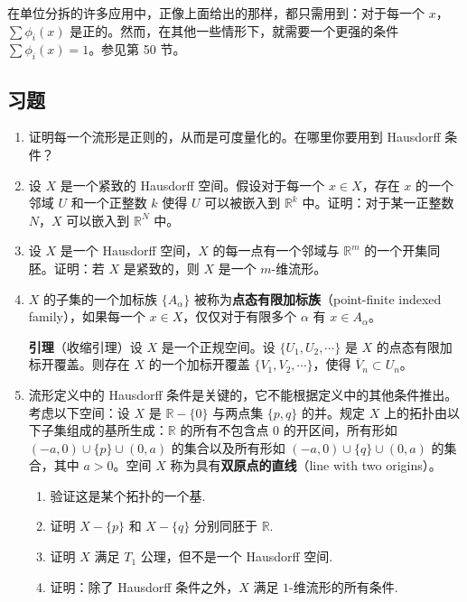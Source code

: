 在单位分拆的许多应用中，正像上面给出的那样，都只需用到：对于每一个 $x$，$\sum\phi_{i}(x)$ 是正的。然而，在其他一些情形下，就需要一个更强的条件 $\sum\phi_{i}(x)=1$。参见第 50 节。

\subsection*{习题}

\begin{enumerate}
\item 证明每一个流形是正则的，从而是可度量化的。在哪里你要用到 Hausdorff 条件？
\item 设 $X$ 是一个紧致的 Hausdorff 空间。假设对于每一个 $x\in X$，存在 $x$ 的一个邻域 $U$ 和一个正整数 $k$ 使得 $U$ 可以被嵌入到 $\mathbb{R}^{k}$ 中。证明：对于某一正整数 $N$，$X$ 可以嵌入到 $\mathbb{R}^{N}$ 中。
\item 设 $X$ 是一个 Hausdorff 空间，$X$ 的每一点有一个邻域与 $\mathbb{R}^{m}$ 的一个开集同胚。证明：若 $X$ 是紧致的，则 $X$ 是一个 $m$-维流形。
\item $X$ 的子集的一个加标族 $\{A_{\alpha}\}$ 被称为\textbf{点态有限加标族}（point-finite indexed family），如果每一个 $x\in X$，仅仅对于有限多个 $\alpha$ 有 $x\in A_{\alpha}$。

\textbf{引理}（收缩引理）\quad 设 $X$ 是一个正规空间。设 $\{U_{1},U_{2},\cdots\}$ 是 $X$ 的点态有限加标开覆盖。则存在 $X$ 的一个加标开覆盖 $\{V_{1},V_{2},\cdots\}$，使得 $\overline{V}_{n}\subset U_{n}$。
\item 流形定义中的 Hausdorff 条件是关键的，它不能根据定义中的其他条件推出。考虑以下空间：设 $X$ 是 $\mathbb{R}-\{0\}$ 与两点集 $\{p,q\}$ 的并。规定 $X$ 上的拓扑由以下子集组成的基所生成：$\mathbb{R}$ 的所有不包含点 $0$ 的开区间，所有形如 $(-a,0)\cup\{p\}\cup(0,a)$ 的集合以及所有形如 $(-a,0)\cup\{q\}\cup(0,a)$ 的集合，其中 $a>0$。空间 $X$ 称为具有\textbf{双原点的直线}（line with two origins）。
\begin{enumerate}
\item 验证这是某个拓扑的一个基.
\item 证明 $X-\{p\}$ 和 $X-\{q\}$ 分别同胚于 $\mathbb{R}$.
\item 证明 $X$ 满足 $T_{1}$ 公理，但不是一个 Hausdorff 空间.
\item 证明：除了 Hausdorff 条件之外，$X$ 满足 $1$-维流形的所有条件.
\end{enumerate}
\end{enumerate}